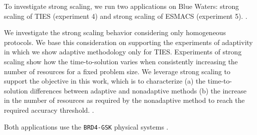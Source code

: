 
To investigate strong scaling, we run two applications on Blue Waters: strong 
scaling of TIES (experiment 4) and strong scaling of ESMACS 
(experiment 5). .

We investigate the
strong scaling behavior considering only homogeneous protocols. We base this 
consideration on supporting the experiments of adaptivity in which we  
show adaptive methodology only for TIES. Experiments of strong scaling
show how the time-to-solution varies when consistently increasing the number of 
resources for a fixed problem size. We leverage strong scaling to support the 
objective in this work, which is to characterize (a) the time-to-solution 
differences between adaptive and nonadaptive methods (b) the increase in the 
number of resources as required by the nonadaptive method to reach the 
required accuracy threshold. 
.


Both applications use the \texttt{BRD4-GSK} physical
systems .






